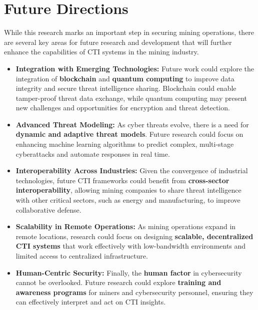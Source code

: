 \documentclass[a4paper,twoside,12pt]{report}
\begin{document}
\section*{Future Directions}

While this research marks an important step in securing mining operations, there are several key areas for future research and development that will further enhance the capabilities of CTI systems in the mining industry. 

\begin{itemize}
    \item \textbf{Integration with Emerging Technologies:} Future work could explore the integration of \textbf{blockchain} and \textbf{quantum computing} to improve data integrity and secure threat intelligence sharing. Blockchain could enable tamper-proof threat data exchange, while quantum computing may present new challenges and opportunities for encryption and threat detection.
    
    \item \textbf{Advanced Threat Modeling:} As cyber threats evolve, there is a need for \textbf{dynamic and adaptive threat models}. Future research could focus on enhancing machine learning algorithms to predict complex, multi-stage cyberattacks and automate responses in real time.
    
    \item \textbf{Interoperability Across Industries:} Given the convergence of industrial technologies, future CTI frameworks could benefit from \textbf{cross-sector interoperability}, allowing mining companies to share threat intelligence with other critical sectors, such as energy and manufacturing, to improve collaborative defense.
    
    \item \textbf{Scalability in Remote Operations:} As mining operations expand in remote locations, research could focus on designing \textbf{scalable, decentralized CTI systems} that work effectively with low-bandwidth environments and limited access to centralized infrastructure.
    
    \item \textbf{Human-Centric Security:} Finally, the \textbf{human factor} in cybersecurity cannot be overlooked. Future research could explore \textbf{training and awareness programs} for miners and cybersecurity personnel, ensuring they can effectively interpret and act on CTI insights.
\end{itemize}
\end{document}
